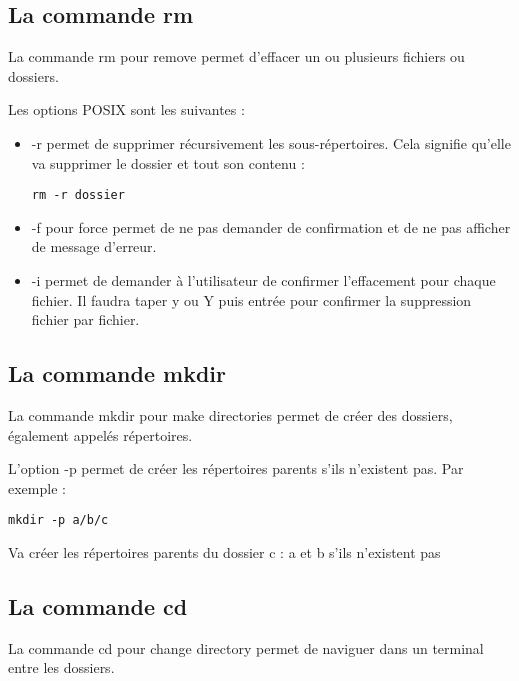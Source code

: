 \documentclass{article}
\begin{document}
\subsection{La commande {\color{blue}rm}}
La commande {\color{blue}rm} pour {\color{blue}remove} permet d'effacer un ou plusieurs fichiers ou dossiers.

Les options {\color{blue}POSIX} sont les suivantes :
\begin{itemize}
\item {\color{blue}-r} permet de supprimer récursivement les sous-répertoires. Cela signifie qu'elle va supprimer le dossier et tout son contenu :

\begin{verbatim}
rm -r dossier
\end{verbatim}
\item {\color{blue}-f} pour {\color{blue}force} permet de ne pas demander de confirmation et de ne pas afficher de message d'erreur.

\item {\color{blue}-i} permet de demander à l'utilisateur de confirmer l'effacement pour chaque fichier. Il faudra taper {\color{blue}y} ou {\color{blue}Y} puis entrée pour confirmer la suppression fichier par fichier.
\end{itemize}

\subsection{La commande {\color{blue}mkdir}}
La commande {\color{blue}mkdir} pour {\color{blue}make directories} permet de créer des dossiers, également appelés répertoires.

L'option {\color{blue}-p} permet de créer les répertoires parents s'ils n'existent pas. Par exemple :

\begin{verbatim}
mkdir -p a/b/c
\end{verbatim}

Va créer les répertoires parents du dossier {\color{blue}c} : {\color{blue}a} et {\color{blue}b} s'ils n'existent pas

\subsection{La commande {\color{blue}cd}}
La commande {\color{blue}cd} pour {\color{blue}change directory} permet de naviguer dans un terminal entre les dossiers.
\end{document}
